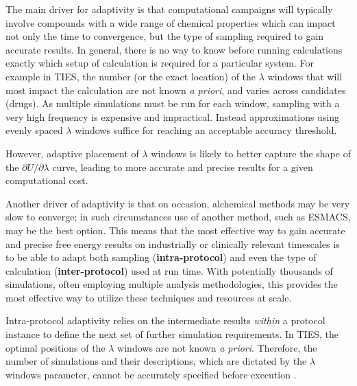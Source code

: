The main driver for adaptivity is that computational campaigns will
typically involve compounds with a wide range of chemical properties which can
impact not only the time to convergence, but the type of sampling required to
gain accurate results. In general, there is no way to know before running
calculations exactly which setup of calculation is required for a particular
system. For example in TIES, the number (or the exact location) of the
$\lambda$ windows that will most impact the calculation are not known
\textit{a priori}, and varies across candidates (drugs). As multiple simulations 
must be run for each window, sampling with a very high frequency is expensive and 
impractical. Instead approximations using evenly spaced $\lambda$ windows
suffice for reaching an acceptable accuracy threshold. 


However, adaptive placement of $\lambda$
windows is likely to better capture the shape of the 
$\partial U/\partial\lambda$ curve, leading to more accurate and precise 
results for a given computational cost.

Another driver of adaptivity is that on occasion, alchemical methods may be very 
slow to converge; in such circumstances use of another method, such as ESMACS,
may be the best option. This means that the most effective way to gain accurate 
and precise free energy results on industrially or clinically relevant 
timescales is to be able to adapt both sampling (\textbf{intra-protocol}) and 
even the type of calculation (\textbf{inter-protocol}) used at run time. With 
potentially thousands of simulations, often employing multiple analysis 
methodologies, this provides the most effective way to utilize these techniques 
and resources at scale.


Intra-protocol adaptivity relies 
on the intermediate results \textit{within} a protocol instance to define the 
next set of further simulation requirements. In TIES, the optimal positions of 
the $\lambda$ windows are not known \textit{a priori}. Therefore, the number of 
simulations and their descriptions, which are dictated by the $\lambda$ windows
parameter, cannot be accurately specified before execution .

